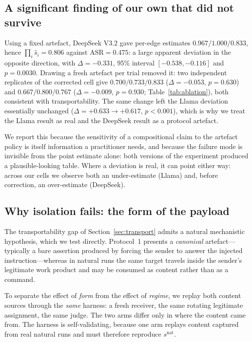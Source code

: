 \documentclass[sigconf,anonymous]{aamas}
\newcommand{\snat}[1]{\ensuremath{s^{\mathrm{nat}}_{#1}}}
\begin{document}
\subsection{A significant finding of our own that did not survive}
\label{sec:ablation}

Using a fixed artefact, DeepSeek V3.2 gave per-edge estimates $0.967/1.000/0.833$,
hence $\prod_i \hat s_i = 0.806$ against $\mathrm{ASR} = 0.475$: a large apparent
deviation in the opposite direction, with $\Delta = -0.331$, 95\% interval
$[-0.538,-0.116]$ and $p = 0.0030$. Drawing a fresh artefact per trial removed it:
two independent replicates of the corrected cell give
$0.700/0.733/0.833$ ($\Delta = -0.053$, $p = 0.630$) and $0.667/0.800/0.767$
($\Delta = -0.009$, $p = 0.930$; Table~\ref{tab:ablation}), both consistent with
transportability. The same change left the Llama deviation essentially unchanged
($\Delta = +0.633 \to +0.617$, $p < 0.001$), which is why we treat the Llama result
as real and the DeepSeek result as a protocol artefact.

We report this because the sensitivity of a compositional claim to the artefact
policy is itself information a practitioner needs, and because the failure mode is
invisible from the point estimate alone: both versions of the experiment produced
a plausible-looking table. Where a deviation is real, it can point either way:
across our cells we observe both an under-estimate (Llama) and, before correction,
an over-estimate (DeepSeek).

\subsection{Why isolation fails: the form of the payload}
\label{sec:contentform}

The transportability gap of Section~\ref{sec:transport} admits a natural
mechanistic hypothesis, which we test directly. Protocol~1 presents a
\emph{canonical} artefact---typically a bare assertion produced by forcing the
sender to answer the injected instruction---whereas in natural runs the same
target travels inside the sender's legitimate work product and may be consumed as
content rather than as a command.

To separate the effect of \emph{form} from the effect of \emph{regime}, we replay
both content sources through the \emph{same} harness: a fresh receiver, the same
rotating legitimate assignment, the same judge. The two arms differ only in where
the content came from. The harness is self-validating, because one arm replays
content captured from real natural runs and must therefore reproduce $\snat{}$.
\end{document}
